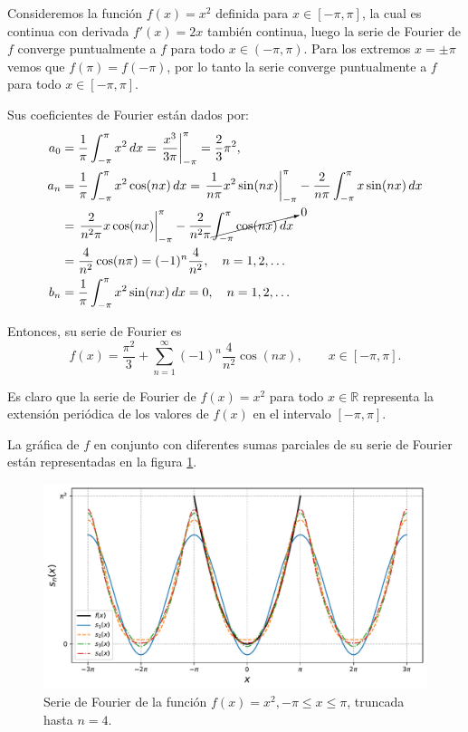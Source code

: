 \begin{ejemplo} \label{EjemploFourier1}
Consideremos la función $f(x) = x^2$ definida para $x\in [-\pi,\pi]$, la cual es continua con derivada $f'(x) = 2x$ también continua, luego la serie de Fourier de $f$ converge puntualmente a $f$ para todo $x \in (-\pi,\pi)$. Para los extremos $x = \pm \pi$ vemos que $f(\pi) = f(-\pi)$, por lo tanto la serie converge puntualmente a $f$ para todo $x \in [-\pi,\pi]$.

Sus coeficientes de Fourier están dados por:
\begin{align*}
    a_0 &= \frac{1}{\pi} \int_{-\pi}^{\pi} x^2 \,dx = \left. \frac{x^3}{3\pi} \right|_{-\pi}^{\pi} = \frac{2}{3} \pi^2, \\
    a_n &= \frac{1}{\pi} \int_{-\pi}^{\pi} x^2 \cos(n x)\,dx =   \left. \frac{1}{n\pi} x^2 \sin(nx)  \right|_{-\pi}^{\pi} - \frac{2}{n\pi} \int_{-\pi}^{\pi} x \sin(nx) \,dx\\
    &= \left.   \frac{2}{n^2\pi} x \cos(nx)\right|_{-\pi}^{\pi} - \frac{2}{n^2 \pi} \cancelto{0}{\int_{-\pi}^{\pi} \cos(nx) \,dx }\\
    &=  \frac{4}{n^2} \cos(n\pi) =  (-1)^n \frac{4}{n^2}, \quad n = 1,2,\dots\\
     b_n &= \frac{1}{\pi} \int_{-\pi}^{\pi} x^2 \sin(nx)\,dx = 0, \quad n = 1,2, \dots
\end{align*}

Entonces, su serie de Fourier es
\begin{equation}
f(x) = \frac{\pi^2}{3} + \sum_{n=1}^{\infty} (-1)^n \frac{4}{n^2} \cos(nx), \qquad x \in [-\pi,\pi].    \label{FourierCuadratica}
\end{equation}

Es claro que la serie de Fourier de $f(x) = x^2$ para todo $x\in \mathbb{R}$ representa la extensión periódica de los valores de $f(x)$ en el intervalo $[-\pi,\pi]$.

La gráfica de $f$ en conjunto con diferentes sumas parciales de su serie de Fourier están representadas en la figura \ref{fig:EjemploFourier1}. 

\begin{figure}[H]
    \centering
    \includegraphics[scale = 0.65]{Figuras/EjemploFourier1.pdf}
    \caption{Serie de Fourier de la función $f(x) = x^2, -\pi \leq x \leq \pi$, truncada hasta $n = 4$.}
    \label{fig:EjemploFourier1}
\end{figure}


\end{ejemplo}
